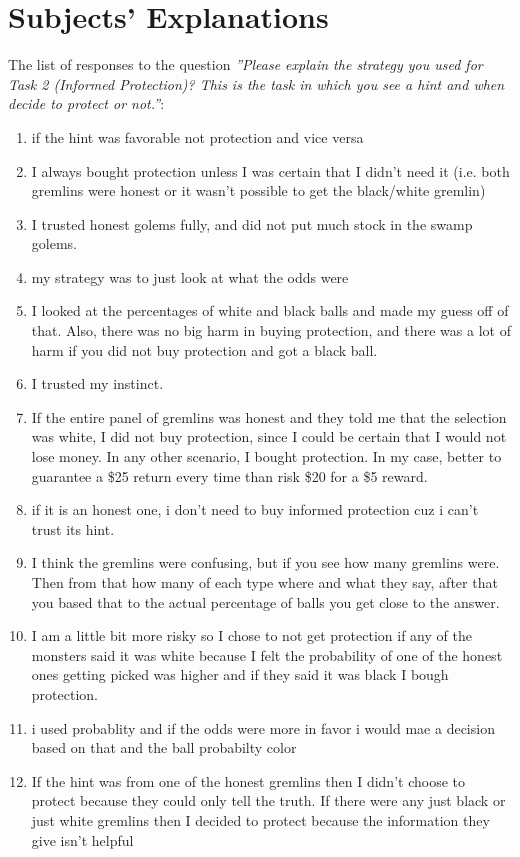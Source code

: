 \documentclass[12pt,a4paper]{article}
\begin{document}
\section{Subjects' Explanations}
\footnotesize
The list of responses to the question \textit{''Please explain the strategy you used for Task 2 (Informed Protection)? This is the task in which you see a hint and when decide to protect or not.''}:
\begin{enumerate}
\itemsep0em 
\item if the hint was favorable not protection and vice versa
\item I always bought protection unless I was certain that I didn't need it (i.e. both gremlins were honest or it wasn't possible to get the black/white gremlin)
\item I trusted honest golems fully, and did not put much stock in the swamp golems.
\item my strategy was to just look at what the odds were
\item I looked at the percentages of white and black balls and made my guess off of that. Also, there was no big harm in buying protection, and there was a lot of harm if you did not buy protection and got a black ball.
\item I trusted my instinct.
\item If the entire panel of gremlins was honest and they told me that the selection was white, I did not buy protection, since I could be certain that I would not lose money. In any other scenario, I bought protection. In my case, better to guarantee a \$25 return every time than risk \$20 for a \$5 reward.
\item if it is an honest one, i don't need to buy informed protection cuz i can't trust its hint.
\item I think the gremlins were confusing, but if you see how many gremlins were. Then from that how many of each type where and what they say, after that you based that to the actual percentage of balls you get close to the answer.
\item I am a little bit more risky so I chose to not get protection if any of the monsters said it was white because I felt the probability of one of the honest ones getting picked was higher and if they said it was black I bough protection.
\item i used probablity and if the odds were more in favor i would mae a decision based on that and the ball probabilty color
\item If the hint was from one of the honest gremlins then I didn't choose to protect because they could only tell the truth. If there were any just black or just white gremlins then I decided to protect because the information they give isn't helpful


\end{enumerate}
\end{document}
